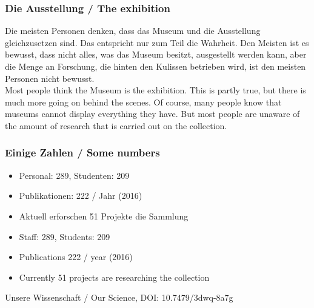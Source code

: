 {\scriptsize
\begin{frame}
  \frametitle{Die Ausstellung / \textcolor{mfn_green}{The exhibition}}
Die meisten Personen denken, dass das Museum und die Ausstellung gleichzusetzen sind. Das entspricht nur zum Teil die Wahrheit. Den Meisten ist es bewusst, dass nicht alles, was das Museum besitzt, ausgestellt werden kann, aber die Menge an Forschung, die hinten den Kulissen betrieben wird, ist den meisten Personen nicht bewusst.\\
  \bigskip
  \textcolor{mfn_green}{Most people think the Museum is the exhibition. This is partly true, but there is much more going on behind the scenes. Of course, many people know that museums cannot display everything they have. But most people are unaware of the amount of research that is carried out on the collection.}
\end{frame}
}
\begin{frame}
  \frametitle{ Einige Zahlen / \textcolor{mfn_green}{Some numbers}}

  \begin{itemize}
  \item{Personal: 289, Studenten: 209}
  \item{Publikationen: 222 / Jahr (2016)}
  \item{Aktuell erforschen 51 Projekte die Sammlung}
  \end{itemize}
  
  \begin{itemize}
  \item{\textcolor{mfn_green}{Staff: 289, Students: 209}}
  \item{\textcolor{mfn_green}{Publications 222 / year (2016)}}
  \item{\textcolor{mfn_green}{Currently 51 projects are researching the collection}}
  \end{itemize}
  \bigskip
  \begin{center}\scriptsize{Unsere Wissenschaft / Our Science, DOI: 10.7479/3dwq-8a7g}\end{center}
\end{frame}

